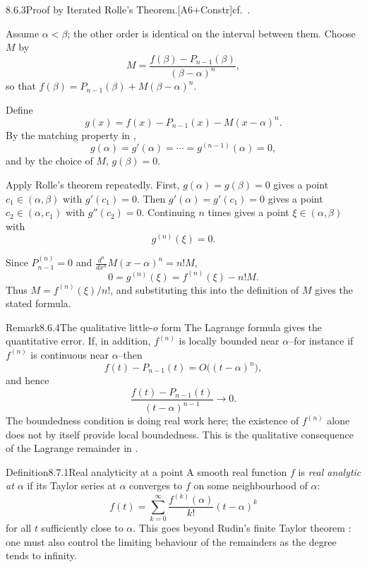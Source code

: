\documentclass[main.tex]{subfiles}
\begin{document}
\begin{Prf}{8.6.3}{Proof by Iterated Rolle's Theorem.}{[A6$+$Constr]\quad cf.\ .}
\item Assume $\alpha<\beta$; the other order is identical on the interval between them.
  Choose $M$ by
  \[
    M=\frac{f(\beta)-P_{n-1}(\beta)}{(\beta-\alpha)^n},
  \]
  so that $f(\beta)=P_{n-1}(\beta)+M(\beta-\alpha)^n$.
\item Define
  \[
    g(x)=f(x)-P_{n-1}(x)-M(x-\alpha)^n .
  \]
  By the matching property in ,
  \[
    g(\alpha)=g'(\alpha)=\cdots=g^{(n-1)}(\alpha)=0,
  \]
  and by the choice of $M$, $g(\beta)=0$.
\item Apply Rolle's theorem repeatedly. First, $g(\alpha)=g(\beta)=0$ gives a point
  $c_1\in(\alpha,\beta)$ with $g'(c_1)=0$. Then $g'(\alpha)=g'(c_1)=0$ gives a point
  $c_2\in(\alpha,c_1)$ with $g''(c_2)=0$. Continuing $n$ times gives a point
  $\xi\in(\alpha,\beta)$ with
  \[
    g^{(n)}(\xi)=0.
  \]
\item Since $P_{n-1}^{(n)}=0$ and $\frac{d^n}{dx^n}M(x-\alpha)^n=n!M$,
  \[
    0=g^{(n)}(\xi)=f^{(n)}(\xi)-n!M.
  \]
  Thus $M=f^{(n)}(\xi)/n!$, and substituting this into the definition of $M$ gives the
  stated formula.
\end{Prf}

\begin{ObjL}{Remark}{8.6.4}{The qualitative little-$o$ form}
The Lagrange formula gives the quantitative error. If, in addition, $f^{(n)}$ is locally
bounded near $\alpha$--for instance if $f^{(n)}$ is continuous near $\alpha$--then
\[
  f(t)-P_{n-1}(t)=O\bigl((t-\alpha)^n\bigr),
\]
and hence
\[
  \frac{f(t)-P_{n-1}(t)}{(t-\alpha)^{n-1}}\longrightarrow0 .
\]
The boundedness condition is doing real work here; the existence of $f^{(n)}$ alone does not
by itself provide local boundedness. This is the qualitative consequence of the Lagrange
remainder in .
\end{ObjL}


\begin{Obj}{Definition}{8.7.1}{Real analyticity at a point}
A smooth real function $f$ is \emph{real analytic at $\alpha$} if its Taylor series at
$\alpha$ converges to $f$ on some neighbourhood of $\alpha$:
\[
  f(t)=\sum_{k=0}^{\infty}\frac{f^{(k)}(\alpha)}{k!}(t-\alpha)^k
\]
for all $t$ sufficiently close to $\alpha$.
This goes beyond Rudin's finite Taylor theorem : one must also control the limiting
behaviour of the remainders as the degree tends to infinity.
\end{Obj}
\end{document}
